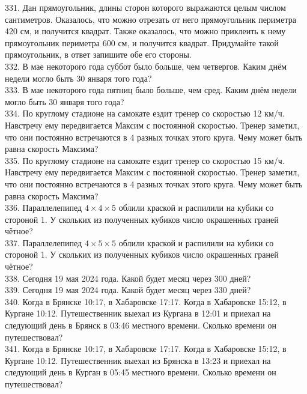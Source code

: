 \documentclass[12pt]{article}
\begin{document}
331. Дан прямоугольник, длины сторон которого выражаются целым числом сантиметров. Оказалось, что можно отрезать от него прямоугольник периметра 420 см, и получится квадрат. Также оказалось, что можно приклеить к нему прямоугольник периметра 600 см, и получится квадрат. Придумайте такой прямоугольник, в ответ запишите обе его стороны.\\
332. В мае некоторого года суббот было больше, чем четвергов. Каким днём недели могло быть 30 января того года?\\
333. В мае некоторого года пятниц было больше, чем сред. Каким днём недели могло быть 30 января того года?\\
334. По круглому стадионе на самокате ездит тренер со скоростью 12 км/ч. Навстречу ему передвигается Максим с постоянной скоростью. Тренер заметил, что они постоянно встречаются в 4 разных точках этого круга. Чему может быть равна скорость Максима?\\
335. По круглому стадионе на самокате ездит тренер со скоростью 15 км/ч. Навстречу ему передвигается Максим с постоянной скоростью. Тренер заметил, что они постоянно встречаются в 4 разных точках этого круга. Чему может быть равна скорость Максима?\\
336. Параллелепипед $4\times4\times5$ облили краской и распилили на кубики со стороной 1. У скольких из полученных кубиков число окрашенных граней чётное?\\
337. Параллелепипед $4\times5\times5$ облили краской и распилили на кубики со стороной 1. У скольких из полученных кубиков число окрашенных граней чётное?\\
338. Сегодня 19 мая 2024 года. Какой будет месяц через 300 дней?\\
339. Сегодня 19 мая 2024 года. Какой будет месяц через 330 дней?\\
340. Когда в Брянске 10:17, в Хабаровске 17:17. Когда в Хабаровске 15:12, в Кургане 10:12. Путешественник выехал из Кургана в 12:01 и приехал на следующий день в Брянск в 03:46 местного времени. Сколько времени он путешествовал?\\
341. Когда в Брянске 10:17, в Хабаровске 17:17. Когда в Хабаровске 15:12, в Кургане 10:12. Путешественник выехал из Брянска в 13:23 и приехал на следующий день в Курган в 05:45 местного времени. Сколько времени он путешествовал?
\newpage
\end{document}
